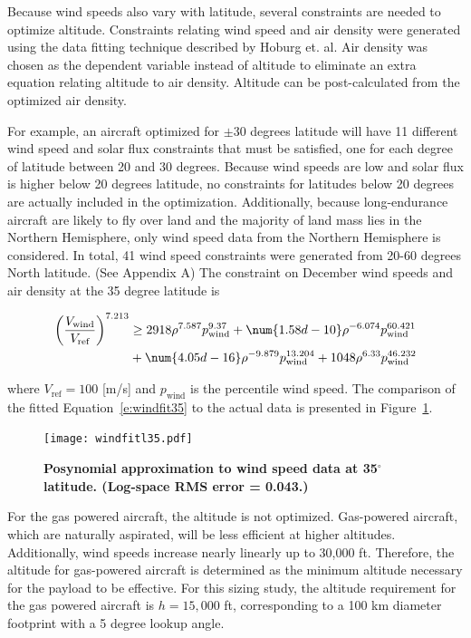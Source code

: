 Because wind speeds also vary with latitude, several constraints are needed to optimize altitude. 
Constraints relating wind speed and air density were generated using the data fitting technique described by Hoburg et. al\cite{fitting}.
Air density was chosen as the dependent variable instead of altitude to eliminate an extra equation relating altitude to air density. 
Altitude can be post-calculated from the optimized air density. 

For example, an aircraft optimized for $\pm$30 degrees latitude will have 11 different wind speed and solar flux constraints that must be satisfied, one for each degree of latitude between 20 and 30 degrees. 
Because wind speeds are low and solar flux is higher below 20 degrees latitude, no constraints for latitudes below 20 degrees are actually included in the optimization. 
Additionally, because long-endurance aircraft are likely to fly over land and the majority of land mass lies in the Northern Hemisphere, only wind speed data from the Northern Hemisphere is considered.
In total, 41 wind speed constraints were generated from 20-60 degrees North latitude. (See Appendix A) 
The constraint on December wind speeds and air density at the 35 degree latitude is 

\begin{align}
    \left(\frac{V_{\text{wind}}}{V_{\text{ref}}}\right)^{7.213} &\geq 2918\rho^{7.587}p_{\text{wind}}^{9.37} + \num{1.58d-10}\rho^{-6.074}p_{\text{wind}}^{60.421} \nonumber \\
    \label{e:windfit35}
    &+ \num{4.05d-16}\rho^{-9.879}p_{\text{wind}}^{13.204} + 1048\rho^{6.33}p_{\text{wind}}^{46.232}
\end{align}

where $V_{\text{ref}} = 100$ [m/s] and $p_{\text{wind}}$ is the percentile wind speed. The comparison of the fitted Equation~\eqref{e:windfit35} to the actual data is presented in Figure~\ref{f:windfitl35}. 

\begin{figure}[H]
	\begin{center}
	\texttt{[image: windfitl35.pdf]}
    \caption{\textbf{Posynomial approximation to wind speed data at 35$^{\circ}$ latitude. (Log-space RMS error = 0.043.)}}
	\label{f:windfitl35}
	\end{center}
\end{figure}

For the gas powered aircraft, the altitude is not optimized.  
Gas-powered aircraft, which are naturally aspirated, will be less efficient at higher altitudes.  
Additionally, wind speeds increase nearly linearly up to 30,000 ft.  
Therefore, the altitude for gas-powered aircraft is determined as the minimum altitude necessary for the payload to be effective.\cite{orion}
For this sizing study, the altitude requirement for the gas powered aircraft is $h=15,000$ ft, corresponding to a 100 km diameter footprint with a 5 degree lookup angle. 

